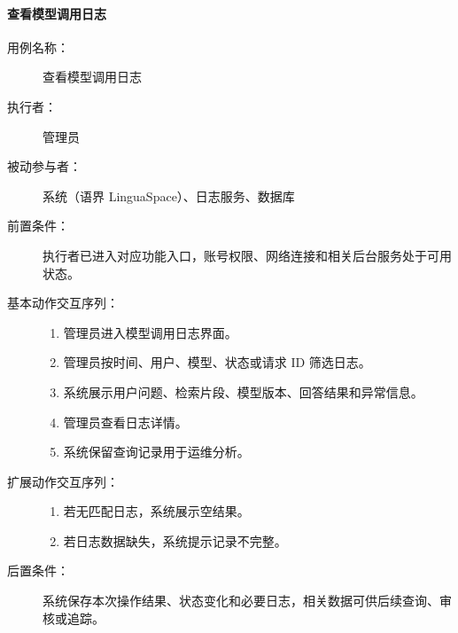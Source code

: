 \paragraph{查看模型调用日志}
\begin{description}
  \item[用例名称：] 查看模型调用日志
  \item[执行者：] 管理员
  \item[被动参与者：] 系统（语界 LinguaSpace）、日志服务、数据库
  \item[前置条件：] 执行者已进入对应功能入口，账号权限、网络连接和相关后台服务处于可用状态。
  \item[基本动作交互序列：]
  \begin{enumerate}
    \item 管理员进入模型调用日志界面。
    \item 管理员按时间、用户、模型、状态或请求 ID 筛选日志。
    \item 系统展示用户问题、检索片段、模型版本、回答结果和异常信息。
    \item 管理员查看日志详情。
    \item 系统保留查询记录用于运维分析。
  \end{enumerate}
  \item[扩展动作交互序列：]
  \begin{enumerate}
    \item[2a.] 若无匹配日志，系统展示空结果。
    \item[3a.] 若日志数据缺失，系统提示记录不完整。
  \end{enumerate}
  \item[后置条件：] 系统保存本次操作结果、状态变化和必要日志，相关数据可供后续查询、审核或追踪。
\end{description}

